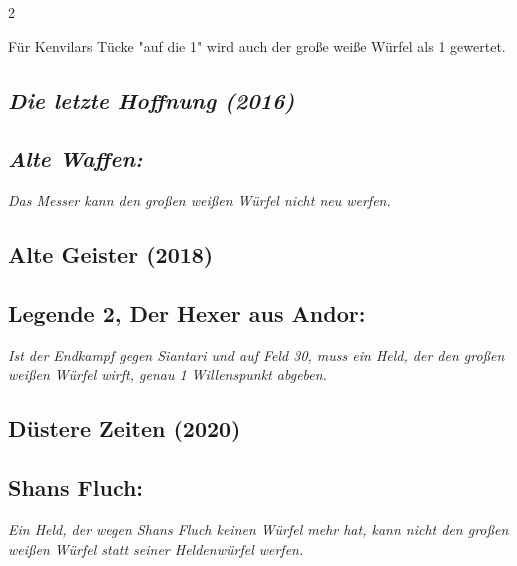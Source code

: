 \documentclass[10pt, a4paper, oneside]{book}
\newcommand{\fan}[1]{\textit{#1}}
\begin{document}
\begin{multicols*}{2}
\begin{bgcolor}
Für Kenvilars Tücke "auf die 1" wird auch der große weiße Würfel als 1 gewertet.
\supercite{15179}

\end{bgcolor}


\begin{bgcolor}
\section{\fan{Die letzte Hoffnung (2016)}}

\subsection{\fan{Alte Waffen:}}

\fan{Das Messer kann den großen weißen Würfel nicht neu werfen.}



\end{bgcolor}






\begin{bgcolor}[color-ag]
\section{Alte Geister (2018)}



\subsection{Legende 2, Der Hexer aus Andor:}

\fan{Ist der Endkampf gegen Siantari und auf Feld 30, muss ein Held, der den großen weißen Würfel wirft, genau 1 Willenspunkt abgeben.}



\end{bgcolor}


\begin{bgcolor}[color-dz]
\section{Düstere Zeiten (2020)}



\subsection{Shans Fluch:}

\fan{Ein Held, der wegen Shans Fluch keinen Würfel mehr hat, kann nicht den großen weißen Würfel statt seiner Heldenwürfel werfen.}




\end{bgcolor}
\end{multicols*}
\end{document}
